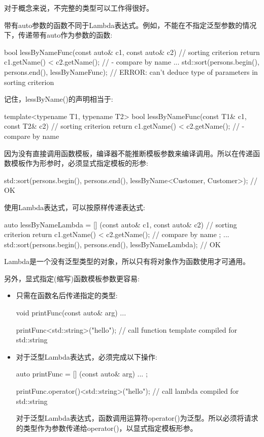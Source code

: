 对于概念来说，不完整的类型可以工作得很好。


带有auto参数的函数不同于Lambda表达式。例如，不能在不指定泛型参数的情况下，传递带有auto作为参数的函数:

\begin{cpp}
bool lessByNameFunc(const auto& c1, const auto& c2) { // sorting criterion
	return c1.getName() < c2.getName(); // - compare by name
}
...
std::sort(persons.begin(), persons.end(),
		  lessByNameFunc); // ERROR: can’t deduce type of parameters in sorting criterion
\end{cpp}

记住，lessByName()的声明相当于:

\begin{cpp}
template<typename T1, typename T2>
bool lessByNameFunc(const T1& c1, const T2& c2) { // sorting criterion
	return c1.getName() < c2.getName(); // - compare by name
}
\end{cpp}

因为没有直接调用函数模板，编译器不能推断模板参数来编译调用。所以在传递函数模板作为形参时，必须显式指定模板的形参:

\begin{cpp}
std::sort(persons.begin(), persons.end(),
		  lessByName<Customer, Customer>); // OK
\end{cpp}

使用Lambda表达式，可以按原样传递表达式:

\begin{cpp}
auto lessByNameLambda = [] (const auto& c1, const auto& c2) { // sorting criterion
							return c1.getName() < c2.getName(); // compare by name
						};
...
std::sort(persons.begin(), persons.end(),
		  lessByNameLambda); // OK
\end{cpp}

Lambda是一个没有泛型类型的对象，所以只有将对象作为函数使用才可通用。

另外，显式指定(缩写)函数模板参数更容易:

\begin{itemize}
\item
只需在函数名后传递指定的类型:

\begin{cpp}
void printFunc(const auto& arg) {
	...
}

printFunc<std::string>("hello"); // call function template compiled for std::string
\end{cpp}

\item
对于泛型Lambda表达式，必须完成以下操作:

\begin{cpp}
auto printFunc = [] (const auto& arg) {
	...
};

printFunc.operator()<std::string>("hello"); // call lambda compiled for std::string
\end{cpp}

对于泛型Lambda表达式，函数调用运算符operator()为泛型。所以必须将请求的类型作为参数传递给operator()，以显式指定模板形参。
\end{itemize}







